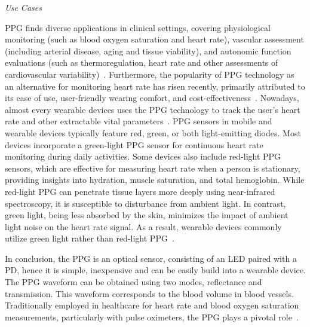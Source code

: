 \vspace{0.2cm}
\textit{Use Cases}
\vspace{0.2cm}

PPG finds diverse applications in clinical settings, covering physiological monitoring (such as blood oxygen saturation and heart rate), vascular assessment (including arterial disease, aging and tissue viability), and autonomic function evaluations (such as thermoregulation, heart rate and other assessments of cardiovascular variability)~\cite{allenPhotoplethysmographyItsApplication2007a}.
Furthermore, the popularity of PPG technology as an alternative for monitoring heart rate has risen recently, primarily attributed to its ease of use, user-friendly wearing comfort, and cost-effectiveness~\cite{sviridovaHumanPhotoplethysmogramNew2015}.
Nowadays, almost every wearable devices uses the PPG technology to track the user's heart rate and other extractable vital parameters~\cite{castanedaReviewWearablePhotoplethysmography2018}.
PPG sensors in mobile and wearable devices typically feature red, green, or both light-emitting diodes.
Most devices incorporate a green-light PPG sensor for continuous heart rate monitoring during daily activities.
Some devices also include red-light PPG sensors, which are effective for measuring heart rate when a person is stationary, providing insights into hydration, muscle saturation, and total hemoglobin.
While red-light PPG can penetrate tissue layers more deeply using near-infrared spectroscopy, it is susceptible to disturbance from ambient light.
In contrast, green light, being less absorbed by the skin, minimizes the impact of ambient light noise on the heart rate signal.
As a result, wearable devices commonly utilize green light rather than red-light PPG~\cite{ponnadaTechnologicalConsiderationsSensorassisted2019}.

\vspace{0.2cm}

In conclusion, the PPG is an optical sensor, consisting of an LED paired with a PD, hence it is simple, inexpensive and can be easily build into a wearable device.
The PPG waveform can be obtained using two modes, reflectance and transmission.
This waveform corresponds to the blood volume in blood vessels.
Traditionally employed in healthcare for heart rate and blood oxygen saturation measurements, particularly with pulse oximeters, the PPG plays a pivotal role~\cite{allenPhotoplethysmographyItsApplication2007a}.

